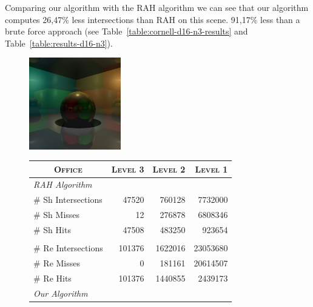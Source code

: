 
Comparing our algorithm with the RAH algorithm we can see that our algorithm computes 26,47\% less intersections than RAH on this scene. 91,17\% less than a brute force approach (see Table~\ref{table:cornell-d16-n3-results} and Table~\ref{table:results-d16-n3}).


\begin{figure}[!htb]
    \begin{minipage}{0.25\linewidth}
        \centering
        \includegraphics[width=4.0cm]{Images/Cornell_Preview}
    \end{minipage}
    \begin{minipage}{0.725\linewidth}
        \centering
        \fontsize{8}{10}
        \selectfont
        \begin{tabular}[h]{l|rrr}
            \multicolumn{1}{c|}{\textsc{Office}} & \textsc{Level 3} & \textsc{Level 2} & \textsc{Level 1}\\
            \hline
            \emph{RAH Algorithm} & & \\
            \hline
            \quad \# Sh Intersections       & 47520     & 760128    & 7732000 \\
            \quad \# Sh Misses              & 12		& 276878    & 6808346 \\
            \quad \# Sh Hits                & 47508		& 483250	& 923654  \\
            & & \\
            \quad \# Re Intersections       & 101376	& 1622016	& 23053680  \\
            \quad \# Re Misses              & 0	        & 181161	& 20614507  \\
            \quad \# Re Hits                & 101376	& 1440855	& 2439173	\\
            \hline
            \emph{Our Algorithm} & & \\
            \hline

\end{tabular}
\end{minipage}
\end{figure}
